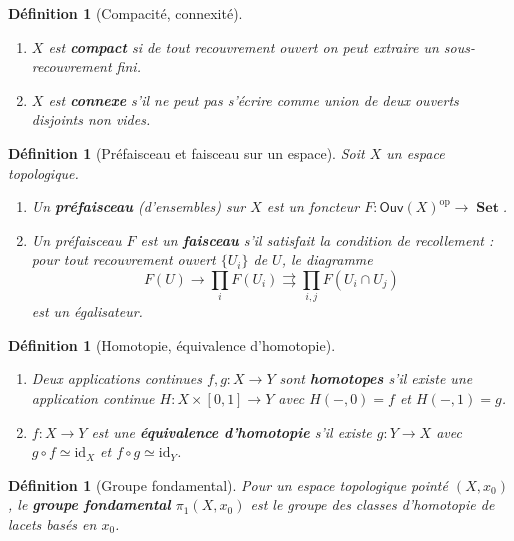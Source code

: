 \documentclass[a4paper,12pt]{book}
\DeclareMathOperator{\Set}{\mathbf{Set}}
\newcommand{\op}{\mathrm{op}}
\newcommand{\id}{\mathrm{id}}
\newtheorem{definition}[theoreme]{Définition}
\begin{document}
\begin{definition}[Compacité, connexité]\label{def:rappel-compact-connexe}
\begin{enumerate}[label=(\roman*)]
\item $X$ est \textbf{compact} si de tout recouvrement ouvert on peut
      extraire un sous-recouvrement fini.
\item $X$ est \textbf{connexe} s'il ne peut pas s'écrire comme
      union de deux ouverts disjoints non vides.
\end{enumerate}
\end{definition}

\begin{definition}[Préfaisceau et faisceau sur un espace]
\label{def:rappel-faisceau}
Soit $X$ un espace topologique.
\begin{enumerate}[label=(\roman*)]
\item Un \textbf{préfaisceau} (d'ensembles) sur $X$ est un foncteur
      $F \colon \mathsf{Ouv}(X)^\op \to \Set$.
\item Un préfaisceau $F$ est un \textbf{faisceau} s'il satisfait la
      condition de recollement : pour tout recouvrement ouvert
      $\{U_i\}$ de $U$, le diagramme
      \[
        F(U) \to \prod_i F(U_i) \rightrightarrows
        \prod_{i,j} F(U_i \cap U_j)
      \]
      est un égalisateur.
\end{enumerate}
\end{definition}

\begin{definition}[Homotopie, équivalence d'homotopie]
\label{def:rappel-homotopie}
\begin{enumerate}[label=(\roman*)]
\item Deux applications continues $f, g \colon X \to Y$ sont
      \textbf{homotopes} s'il existe une application continue
      $H \colon X \times [0,1] \to Y$ avec $H(-, 0) = f$ et
      $H(-, 1) = g$.
\item $f \colon X \to Y$ est une \textbf{équivalence d'homotopie}
      s'il existe $g \colon Y \to X$ avec $g \circ f \simeq \id_X$
      et $f \circ g \simeq \id_Y$.
\end{enumerate}
\end{definition}

\begin{definition}[Groupe fondamental]\label{def:rappel-pi1}
Pour un espace topologique pointé $(X, x_0)$, le \textbf{groupe
fondamental} $\pi_1(X, x_0)$ est le groupe des classes d'homotopie
de lacets basés en $x_0$.
\end{definition}
\end{document}
